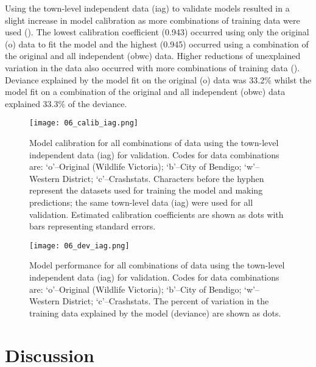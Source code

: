 Using the town-level independent data (iag) to validate models resulted in a slight increase in model calibration as more combinations of training data were used ().  The lowest calibration coefficient (0.943) occurred using only the original (o) data to fit the model and the highest (0.945) occurred using a combination of the original and all independent (obwc) data. Higher reductions of unexplained variation in the data also occurred with more combinations of training data (). Deviance explained by the model fit on the original (o) data was 33.2\% whilst the model fit on a combination of the original and all independent (obwc) data explained 33.3\% of the deviance.

\begin{figure*}[!t]
  \centering
  \texttt{[image: 06\_calib\_iag.png]}
  \caption[Model calibration for all combinations of training data using the town-level independent data for validation]{Model calibration for all combinations of data using the town-level independent data (iag) for validation. Codes for data combinations are: `o'--Original (Wildlife Victoria); `b'--City of Bendigo; `w'--Western District; `c'--Crashstats. Characters before the hyphen represent the datasets used for training the model and making predictions; the same town-level data (iag) were used for all validation. Estimated calibration coefficients are shown as dots with bars representing standard errors.}
  \label{val_calib_iag}
\end{figure*}

\begin{figure*}[!t]
  \centering
  \texttt{[image: 06\_dev\_iag.png]}
  \caption[Model performance for all combinations of training data using the town-level independent data for validation]{Model performance for all combinations of data using the town-level independent data (iag) for validation. Codes for data combinations are: `o'--Original (Wildlife Victoria); `b'--City of Bendigo; `w'--Western District; `c'--Crashstats. The percent of variation in the training data explained by the model (deviance) are shown as dots.}
  \label{val_calib_dev}
\end{figure*}

\section{Discussion}

